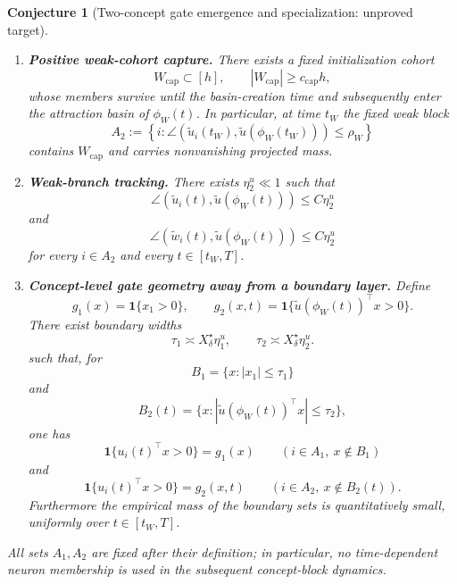 \documentclass{article} %
\theoremstyle{plain}
\newtheorem{conjecture}[theorem]{Conjecture}
\theoremstyle{definition}
\theoremstyle{remark}
\begin{document}
\begin{conjecture}[Two-concept gate emergence and specialization: unproved target]
\begin{enumerate}[label=\textnormal{(\roman*)}]
On $[t_{\mathrm{create}},T]$ these selected crossings admit one-sided
continuations
\[
\phi_R(t)<\phi_W(t)
\]
provided the later continuation/capture guards remain active. When the
continuation lies inside smooth gate cells, the corresponding derivative
margins satisfy
\[
\partial_\phi V_{\mathrm{true}}(\phi_R(t);t)\ge\lambda_R>0,
\qquad
\partial_\phi V_{\mathrm{true}}(\phi_W(t);t)\le-\lambda_W<0.
\]
A smooth reference branch used for tracking is a comparison object and need
not coincide pointwise with a globally smooth empirical root.

\item
\textbf{Positive weak-cohort capture.}
There exists a fixed initialization cohort
\[
W_{\mathrm{cap}}\subset[h],
\qquad
|W_{\mathrm{cap}}|\ge c_{\mathrm{cap}}h,
\]
whose members survive until the basin-creation time and subsequently
enter the attraction basin of \(\phi_W(t)\).
In particular, at time \(t_W\) the fixed weak block
\[
A_2
:=
\left\{
i:
\angle(\widetilde u_i(t_W),
       \widetilde u(\phi_W(t_W)))
\le \rho_W
\right\}
\]
contains \(W_{\mathrm{cap}}\) and carries nonvanishing projected mass.

\item
\textbf{Weak-branch tracking.}
There exists \(\eta_2^u\ll1\) such that
\[
\angle(
\widetilde u_i(t),
\widetilde u(\phi_W(t))
)
\le
C\eta_2^u
\]
and
\[
\angle(
\widetilde w_i(t),
\widetilde u(\phi_W(t))
)
\le
C\eta_2^u
\]
for every \(i\in A_2\) and every \(t\in[t_W,T]\).

\item
\textbf{Concept-level gate geometry away from a boundary layer.}
Define
\[
g_1(x)
=
\mathbf 1\{x_1>0\},
\qquad
g_2(x,t)
=
\mathbf 1\{
\widetilde u(\phi_W(t))^\top x>0
\}.
\]
There exist boundary widths
\[
\tau_1
\asymp
X_\delta^\star\eta_1^u,
\qquad
\tau_2
\asymp
X_\delta^\star\eta_2^u.
\]
such that, for
\[
B_1
=
\{x:|x_1|\le\tau_1\}
\]
and
\[
B_2(t)
=
\{
x:
|\widetilde u(\phi_W(t))^\top x|
\le\tau_2
\},
\]
one has
\[
\mathbf 1\{u_i(t)^\top x>0\}
=
g_1(x)
\qquad
(i\in A_1,\ x\notin B_1)
\]
and
\[
\mathbf 1\{u_i(t)^\top x>0\}
=
g_2(x,t)
\qquad
(i\in A_2,\ x\notin B_2(t)).
\]
Furthermore the empirical mass of the boundary sets is quantitatively
small, uniformly over \(t\in[t_W,T]\).

\end{enumerate}

All sets \(A_1,A_2\) are fixed after their definition; in particular,
no time-dependent neuron membership is used in the subsequent
concept-block dynamics.
\end{conjecture}
\end{document}
